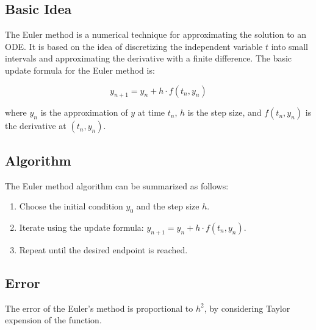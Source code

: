 \documentclass[french,12pt,a4paper]{book}
\numberwithin{equation}{chapter}
\begin{document}
\subsection{Basic Idea}

The Euler method is a numerical technique for approximating the solution to an ODE. It is based on the idea of discretizing the independent variable \( t \) into small intervals and approximating the derivative with a finite difference. The basic update formula for the Euler method is:

\[ y_{n+1} = y_n + h \cdot f(t_n, y_n) \]

where \( y_n \) is the approximation of \( y \) at time \( t_n \), \( h \) is the step size, and \( f(t_n, y_n) \) is the derivative at \( (t_n, y_n) \).

\subsection{Algorithm}

The Euler method algorithm can be summarized as follows:

\begin{enumerate}
    \item Choose the initial condition \( y_0 \) and the step size \( h \).
    \item Iterate using the update formula: \( y_{n+1} = y_n + h \cdot f(t_n, y_n) \).
    \item Repeat until the desired endpoint is reached.
\end{enumerate}

\subsection{Error}

The error of the Euler's method is proportional to $h^2$, by considering Taylor expension of the function. 
\end{document}
